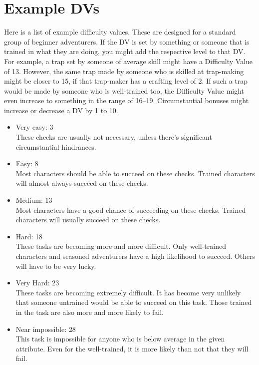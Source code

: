 \section{Example DVs}\label{sec:exampleDVs}
Here is a list of example difficulty values.
These are designed for a standard group of beginner adventurers.
If the DV is set by something or someone that is trained in what they are doing, you might add the respective level to that DV.
For example, a trap set by someone of average skill might have a Difficulty Value of 13.
However, the same trap made by someone who is skilled at trap-making might be closer to 15, if that trap-maker has a crafting level of 2.
If such a trap would be made by someone who is well-trained too, the Difficulty Value might even increase to something in the range of 16--19.
Circumstantial bonuses might increase or decrease a DV by 1 to 10.

\begin{itemize}
    \item Very easy: 3\\
    These checks are usually not necessary, unless there's significant circumstantial hindrances.
    \item Easy: 8\\
    Most characters should be able to succeed on these checks.
    Trained characters will almost always succeed on these checks.
    \item Medium: 13\\
    Most characters have a good chance of succeeding on these checks.
    Trained characters will usually succeed on these checks.
    \item Hard: 18\\
    These tasks are becoming more and more difficult.
    Only well-trained characters and seasoned adventurers have a high likelihood to succeed.
    Others will have to be very lucky.
    \item Very Hard: 23\\
    These tasks are becoming extremely difficult.
    It has become very unlikely that someone untrained would be able to succeed on this task.
    Those trained in the task are also more and more likely to fail.
    \item Near impossible: 28\\
    This task is impossible for anyone who is below average in the given attribute.
    Even for the well-trained, it is more likely than not that they will fail.
\end{itemize}


